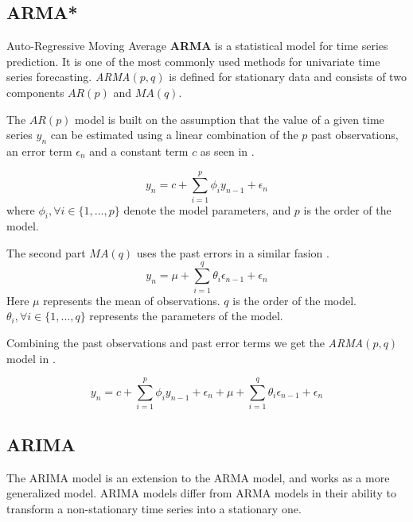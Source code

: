 
\subsection{ARMA*}

Auto-Regressive Moving Average \textbf{ARMA} is a statistical model for time series prediction.
It is one of the most commonly used methods for univariate time series forecasting.
\textit{ARMA}$(p, q)$ is defined for stationary data and consists of two components $AR(p)$ and $MA(q)$.

The $AR(p)$ model is built on the assumption that the value of a given time series $y_n$ can be estimated using a linear combination
of the $p$ past observations, an error term $\epsilon_n$ and a constant term $c$ as seen in  \citep{Box2016}.

\begin{equation}
  \label{eq:arma_ar(p)}
  y_n = c + \sum_{i=1}^{p} \phi_i y_{n-1} + \epsilon_n
\end{equation}
where $\phi_i, \forall i \in \{1, ..., p\} $ denote the model parameters, and $p$ is the order of the model.

The second part $MA(q)$ uses the past errors in a similar fasion .
\begin{equation}
  \label{eq_arma_ma(q)}
  y_n = \mu + \sum_{i=1}^{q} \theta_i \epsilon_{n-1} + \epsilon_n
\end{equation}
Here $\mu$ represents the mean of observations. $q$ is the order of the model. $\theta_i, \forall i \in \{1, ..., q\}$ represents the parameters of the model.

Combining the past observations  and past error terms  we get the \textit{ARMA}$(p,q)$ model in .

\begin{equation}
  \label{eq:arma}
  y_n = c + \sum_{i=1}^{p} \phi_i y_{n-1} + \epsilon_n + \mu + \sum_{i=1}^{q} \theta_i \epsilon_{n-1} + \epsilon_n
\end{equation}


\subsection{ARIMA}
The ARIMA model is an extension to the ARMA model, and works as a more generalized model.
ARIMA models differ from ARMA models in their ability to transform a non-stationary time series into a stationary one.

